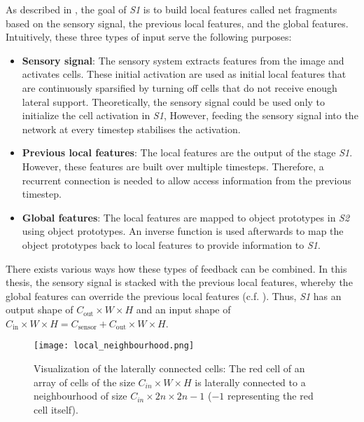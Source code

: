 
As described in , the goal of \emph{S1} is to build local features called net fragments based on the sensory signal, the previous local features, and the global features.
Intuitively, these three types of input serve the following purposes:
\begin{itemize}
    \item \textbf{Sensory signal}: The sensory system extracts features from the image and activates cells. These initial activation are used as initial local features that are continuously sparsified by turning off cells that do not receive enough lateral support. Theoretically, the sensory signal could be used only to initialize the cell activation in \emph{S1}, However, feeding the sensory signal into the network at every timestep stabilises the activation.
    \item \textbf{Previous local features}: The local features are the output of the stage \emph{S1}. However, these features are built over multiple timesteps.
    Therefore, a recurrent connection is needed to allow access information from the previous timestep.
    \item \textbf{Global features}: The local features are mapped to object prototypes in \emph{S2} using object prototypes. An inverse function is used afterwards to map the object prototypes back to local features to provide information to \emph{S1}.
\end{itemize}

There exists various ways how these types of feedback can be combined. In this thesis, the sensory signal is stacked with the previous local features, whereby the global features can override the previous local features (c.f. ).
Thus, \emph{S1} has an output shape of $C_{\text{out}} \times W \times H$ and an input shape of $C_{\text{in}} \times W \times H = C_{\text{sensor}} + C_{\text{out}} \times W \times H$.

\begin{figure}[h]
    \centering
    \texttt{[image: local\_neighbourhood.png]}
    \caption[Laterally connected cells]{Visualization of the laterally connected cells: The red cell of an array of cells of the size $C_{in} \times W \times H$ is laterally connected to a neighbourhood of size  $C_{in} \times 2n \times 2n - 1$ ($-1$ representing the red cell itself).}
\end{figure}


